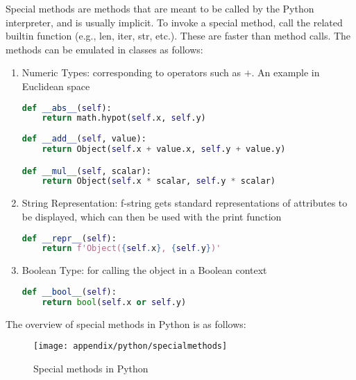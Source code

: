 Special methods are methods that are meant to be called by the Python interpreter, and is usually implicit. To invoke a special method, call the related builtin function (e.g., len, iter, str, etc.). These are faster than method calls. The methods can be emulated in classes as follows:
\begin{enumerate}[label=\roman*.]
\setlength{\itemsep}{0pt}
\item Numeric Types: corresponding to operators such as $+$. An example in Euclidean space
\begin{lstlisting}[language=Python]
def __abs__(self):
	return math.hypot(self.x, self.y)
	
def __add__(self, value):
	return Object(self.x + value.x, self.y + value.y)

def __mul__(self, scalar):
	return Object(self.x * scalar, self.y * scalar)
\end{lstlisting}
\item String Representation: f-string gets standard representations of attributes to be displayed, which can then be used with the print function
\begin{lstlisting}[language=Python]
def __repr__(self):
	return f'Object({self.x}, {self.y})'
\end{lstlisting}
\item Boolean Type: for calling the object in a Boolean context
\begin{lstlisting}[language=Python]
def __bool__(self):
	return bool(self.x or self.y)
\end{lstlisting}
\end{enumerate}

The overview of special methods in Python is as follows:
\begin{figure}[H]
\centering
\texttt{[image: appendix/python/specialmethods]}
\caption{Special methods in Python}
\end{figure}